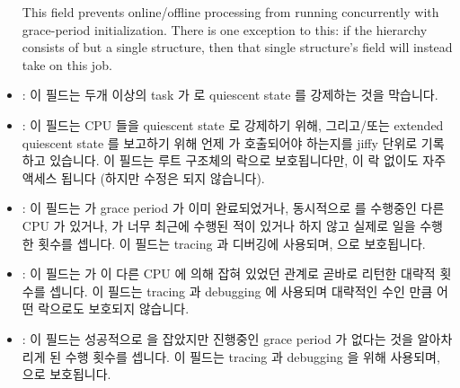 \begin{itemize}
	This field prevents online/offline processing from running
	concurrently with grace-period initialization.
	There is one exception to this: if the 
	hierarchy consists of but a single structure, then
	that single structure's  field will instead take on
	this job.
	\fi
\item	{}:
	이 필드는 두개 이상의 task 가  로 quiescent
	state 를 강제하는 것을 막습니다.
	\iffalse

	This field prevents more than one task from forcing quiescent
	states with \co{force_quiescent_state()}.
	\fi
\item	{}:
	이 필드는 CPU 들을 quiescent state 로 강제하기 위해, 그리고/또는
	extended quiescent state 를 보고하기 위해 언제
	 가 호출되어야 하는지를 jiffy 단위로
	기록하고 있습니다.
	이 필드는 루트  구조체의 락으로 보호됩니다만, 이 락 없이도
	자주 액세스 됩니다 (하지만 수정은 되지 않습니다).
	\iffalse

	This field contains the time, in jiffies, when
	\co{force_quiescent_state()} should be invoked in order to
	force CPUs into quiescent states and/or report extended
	quiescent states.
	This field is guarded by the root \co{rcu_node} structure's lock,
	but is frequently accessed (but never modified) without holding
	this lock.
	\fi
\item	{}:
	이 필드는  가 grace period 가 이미
	완료되었거나, 동시적으로  를 수행중인 다른
	CPU 가 있거나,  가 너무 최근에 수행된 적이
	있거나 하지 않고 실제로 일을 수행한 횟수를 셉니다.
	이 필드는 tracing 과 디버깅에 사용되며,  으로 보호됩니다.
	\iffalse

	This field counts the number of calls to \co{force_quiescent_state()}
	that actually do work, as opposed to leaving early due to
	the grace period having already completed, some other
	CPU currently running \co{force_quiescent_state()},
	or \co{force_quiescent_state()} having run too recently.
	This field is used for tracing and debugging, and
	is guarded by \co{->fqslock}.
	\fi
\item	{}:
	이 필드는  가  이 다른 CPU 에
	의해 잡혀 있었던 관계로 곧바로 리턴한 대략적 횟수를 셉니다.
	이 필드는 tracing 과 debugging 에 사용되며 대략적인 수인 만큼 어떤
	락으로도 보호되지 않습니다.
	\iffalse

	This field holds an approximate count of the number of times that
	\co{force_quiescent_state()} returned early due to the
	\co{->fqslock} being held by some other CPU.
	This field is used for tracing and debugging, and is not
	guarded by any lock, hence its approximate nature.
	\fi
\item	{}:
	이 필드는 성공적으로  을 잡았지만 진행중인 grace period
	가 없다는 것을 알아차리게 된  수행 횟수를
	셉니다.
	이 필드는 tracing 과 debugging 을 위해 사용되며,  으로
	보호됩니다.
	\iffalse


\end{itemize}
